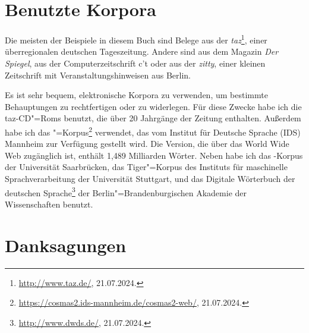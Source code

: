 \section*{Benutzte Korpora}

Die meisten der Beispiele in diesem Buch sind Belege aus der {\em taz}\footnote{
\url{http://www.taz.de/}, 21.07.2024.}, einer überregionalen
deutschen Tageszeitung. Andere sind aus dem Magazin \emph{Der Spiegel},
aus der Computerzeitschrift c't oder aus der \emph{zitty}, einer kleinen Zeitschrift mit
Veranstaltungshinweisen aus Berlin. 


Es ist sehr bequem, elektronische Korpora zu verwenden, um bestimmte Behauptungen zu rechtfertigen
oder zu widerlegen.
Für diese Zwecke habe ich die taz-CD"=Roms benutzt, die über 20 Jahrgänge der Zeitung enthalten.
Außerdem habe ich das \cosmas"=Korpus\footnote{\url{https://cosmas2.ids-mannheim.de/cosmas2-web/}, 21.07.2024.} 
verwendet, das vom Institut für Deutsche Sprache (IDS) Mannheim zur Verfügung gestellt
wird. Die Version, die über das World Wide Web zugänglich ist, enthält 1,489 Milliarden Wörter.
Neben \cosmas habe ich das \negra{}\hyp Korpus der Universität Saarbrücken,
das Tiger"=Korpus des Instituts für maschinelle Sprachverarbeitung der Universität Stuttgart,
und das Digitale Wörterbuch der deutschen Sprache\footnote{\url{http://www.dwds.de/}, 21.07.2024.} der 
Berlin"=Brandenburgischen Akademie der Wissenschaften benutzt.


\section*{Danksagungen}

